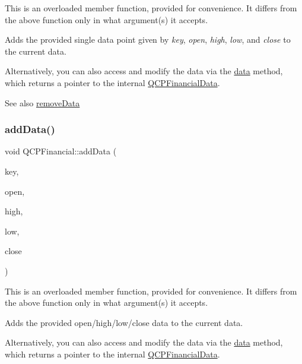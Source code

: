 This is an overloaded member function, provided for convenience. It differs from the above function only in what argument(s) it accepts.

Adds the provided single data point given by {\itshape key}, {\itshape open}, {\itshape high}, {\itshape low}, and {\itshape close} to the current data.

Alternatively, you can also access and modify the data via the \mbox{\hyperlink{class_q_c_p_financial_a528c81578e4f25999a9169127763cfd4}{data}} method, which returns a pointer to the internal \mbox{\hyperlink{class_q_c_p_financial_data}{Q\+C\+P\+Financial\+Data}}.

\begin{DoxySeeAlso}{See also}
\mbox{\hyperlink{class_q_c_p_financial_a048c741d3c8cc5709c2c44b759fdf27c}{remove\+Data}} 
\end{DoxySeeAlso}
\mbox{\label{class_q_c_p_financial_aa1abe3bdafb297497f09cdbdc4db3958}} 
\subsubsection{\texorpdfstring{add\+Data()}{addData()}\hspace{0.1cm}{\footnotesize\ttfamily [4/4]}}
{\footnotesize\ttfamily void Q\+C\+P\+Financial\+::add\+Data (\begin{DoxyParamCaption}\item[{const Q\+Vector$<$ double $>$ \&}]{key,  }\item[{const Q\+Vector$<$ double $>$ \&}]{open,  }\item[{const Q\+Vector$<$ double $>$ \&}]{high,  }\item[{const Q\+Vector$<$ double $>$ \&}]{low,  }\item[{const Q\+Vector$<$ double $>$ \&}]{close }\end{DoxyParamCaption})}

This is an overloaded member function, provided for convenience. It differs from the above function only in what argument(s) it accepts.

Adds the provided open/high/low/close data to the current data.

Alternatively, you can also access and modify the data via the \mbox{\hyperlink{class_q_c_p_financial_a528c81578e4f25999a9169127763cfd4}{data}} method, which returns a pointer to the internal \mbox{\hyperlink{class_q_c_p_financial_data}{Q\+C\+P\+Financial\+Data}}.

